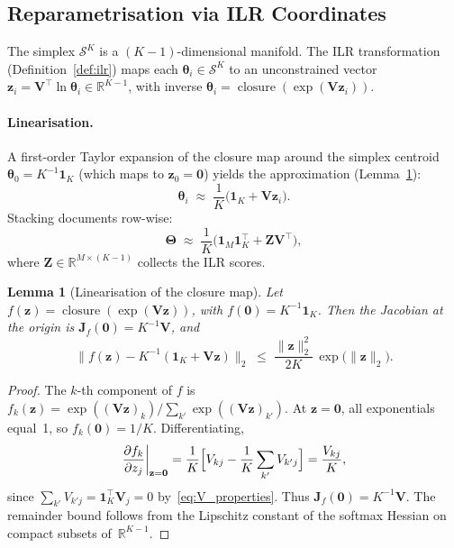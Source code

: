 \documentclass{article}
\newtheorem{lemma}[theorem]{Lemma}
\DeclareMathOperator{\closure}{closure}
\begin{document}
\subsection{Reparametrisation via ILR Coordinates}
\label{subsec:reparametrisation}

The simplex $\mathcal{S}^K$ is a $(K{-}1)$-dimensional manifold. The
ILR transformation (Definition~\ref{def:ilr}) maps each
$\boldsymbol{\theta}_i\in\mathcal{S}^K$ to an unconstrained vector
$\mathbf{z}_i = \mathbf{V}^{\!\top}\ln\boldsymbol{\theta}_i
 \in\mathbb{R}^{K-1}$,
with inverse
$\boldsymbol{\theta}_i
 = \closure(\exp(\mathbf{V}\mathbf{z}_i))$.

\paragraph{Linearisation.}
A first-order Taylor expansion of the closure map around the simplex
centroid $\boldsymbol{\theta}_0 = K^{-1}\mathbf{1}_K$ (which maps to
$\mathbf{z}_0=\mathbf{0}$) yields the approximation
(Lemma~\ref{lem:linearisation}):
%
\begin{equation}
  \boldsymbol{\theta}_i
  \;\approx\;
  \frac{1}{K}\bigl(\mathbf{1}_K + \mathbf{V}\mathbf{z}_i\bigr).
  \label{eq:theta_approx}
\end{equation}
%
Stacking documents row-wise:
\begin{equation}
  \boldsymbol{\Theta}
  \;\approx\;
  \frac{1}{K}
  \bigl(\mathbf{1}_M\mathbf{1}_K^{\!\top}
        + \mathbf{Z}\mathbf{V}^{\!\top}\bigr),
  \label{eq:Theta_approx}
\end{equation}
where $\mathbf{Z}\in\mathbb{R}^{M\times(K{-}1)}$ collects the ILR
scores.

\begin{lemma}[Linearisation of the closure map]
\label{lem:linearisation}
Let $f(\mathbf{z}) = \closure(\exp(\mathbf{V}\mathbf{z}))$, with
$f(\mathbf{0})=K^{-1}\mathbf{1}_K$. Then the Jacobian at the origin is
$\mathbf{J}_f(\mathbf{0}) = K^{-1}\mathbf{V}$, and
\[
  \bigl\|
    f(\mathbf{z})
    - K^{-1}(\mathbf{1}_K + \mathbf{V}\mathbf{z})
  \bigr\|_2
  \;\leq\;
  \frac{\|\mathbf{z}\|_2^2}{2K}
  \,\exp\!\bigl(\|\mathbf{z}\|_2\bigr).
\]
\end{lemma}

\begin{proof}
The $k$-th component of $f$ is
$f_k(\mathbf{z}) = \exp((\mathbf{V}\mathbf{z})_k)/\sum_{k'}
\exp((\mathbf{V}\mathbf{z})_{k'})$.
At $\mathbf{z}=\mathbf{0}$, all exponentials equal~1, so
$f_k(\mathbf{0})=1/K$. Differentiating,
\[
  \frac{\partial f_k}{\partial z_j}\bigg|_{\mathbf{z}=\mathbf{0}}
  = \frac{1}{K}\Bigl[V_{kj}
    - \frac{1}{K}\sum_{k'}V_{k'j}\Bigr]
  = \frac{V_{kj}}{K},
\]
since $\sum_{k'}V_{k'j} = \mathbf{1}_K^{\!\top}\mathbf{V}_j = 0$
by~\eqref{eq:V_properties}. Thus
$\mathbf{J}_f(\mathbf{0}) = K^{-1}\mathbf{V}$.
The remainder bound follows from the Lipschitz constant of the
softmax Hessian on compact subsets of~$\mathbb{R}^{K-1}$.
\end{proof}
\end{document}
